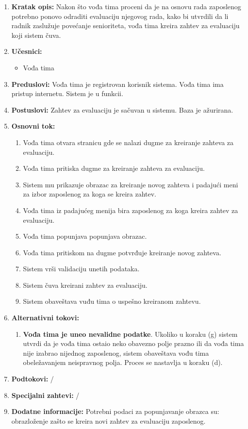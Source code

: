 \documentclass[a4paper]{article}
\begin{document}
\begin{enumerate}
    \item \textbf{Kratak opis:} Nakon što vođa tima proceni da je na osnovu rada zaposlenog potrebno ponovo odraditi evaluaciju njegovog rada, kako bi utvrdili da li radnik zaslužuje povećanje senioriteta, vođa tima kreira zahtev za evaluaciju koji sistem čuva.
    \item \textbf{Učesnici:}
        \begin{itemize}
            \item Vođa tima
        \end{itemize}
    \item \textbf{Preduslovi:} Vođa tima je registrovan korisnik sistema. Vođa tima ima pristup internetu. Sistem je u funkcii.
    \item \textbf{Postuslovi:} Zahtev za evaluaciju je sačuvan u sistemu. Baza je ažurirana.
    \item \textbf{Osnovni tok:}
        \begin{enumerate}
            \item Vođa tima otvara stranicu gde se nalazi dugme za kreiranje zahteva za evaluaciju.
            \item Vođa tima pritiska dugme za kreiranje zahteva za evaluaciju.
            \item Sistem mu prikazuje obrazac za kreiranje novog zahteva i padajući meni za izbor zaposlenog za koga se kreira zahtev.
            \item Vođa tima iz padajućeg menija bira zaposlenog za koga kreira zahtev za evaluaciju.
            \item Vođa tima popunjava popunjava obrazac.
            \item Vođa tima pritiskom na dugme potvrđuje kreiranje novog zahteva.
            \item Sistem vrši validaciju unetih podataka.
            \item Sistem čuva kreirani zahtev za evaluaciju.
            \item Sistem obaveštava vuđu tima o uspešno kreiranom zahtevu.
        \end{enumerate}
    \item \textbf{Alternativni tokovi:}
        \begin{enumerate}
            \item \textbf{Vođa tima je uneo nevalidne podatke}. Ukoliko u koraku (g) sistem utvrdi da je vođa tima ostaio neko obavezno polje prazno ili da vođa tima nije izabrao nijednog zaposlenog, sistem obaveštava vođu tima obeležavanjem neispravnog polja. Proces se nastavlja u koraku (d).
        \end{enumerate}
    \item \textbf{Podtokovi:} /
    \item \textbf{Specijalni zahtevi:} /
    \item \textbf{Dodatne informacije:} Potrebni podaci za popunjavanje obrazca su: obrazloženje zašto se kreira novi zahtev za evaluaciju zaposlenog.
\end{enumerate}
\end{document}
